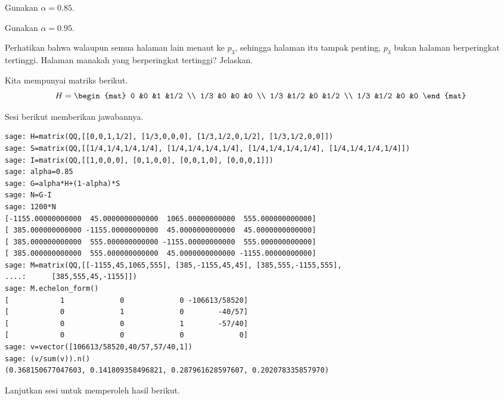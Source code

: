 \begin{exercises}
    \begin{exparts}
      \item Gunakan $\alpha=0.85$.
      \item Gunakan $\alpha=0.95$.
      \item Perhatikan bahwa walaupun semua halaman lain menaut ke $p_3$,
        sehingga halaman itu tampak penting, $p_3$ bukan halaman berperingkat
        tertinggi. Halaman manakah yang berperingkat tertinggi? Jelaskan.
    \end{exparts}
    \begin{answer}
      Kita mempunyai matriks berikut.
      \begin{equation*}
          H=\begin{mat}
               0     &0    &1    &1/2   \\
               1/3   &0    &0    &0   \\
               1/3   &1/2  &0    &1/2 \\
               1/3   &1/2  &0    &0
          \end{mat}
      \end{equation*}
      \begin{exparts}
        \item Sesi \Sage{} berikut memberikan jawabannya.
\begin{lstlisting}
sage: H=matrix(QQ,[[0,0,1,1/2], [1/3,0,0,0], [1/3,1/2,0,1/2], [1/3,1/2,0,0]])
sage: S=matrix(QQ,[[1/4,1/4,1/4,1/4], [1/4,1/4,1/4,1/4], [1/4,1/4,1/4,1/4], [1/4,1/4,1/4,1/4]])
sage: I=matrix(QQ,[[1,0,0,0], [0,1,0,0], [0,0,1,0], [0,0,0,1]])
sage: alpha=0.85
sage: G=alpha*H+(1-alpha)*S
sage: N=G-I
sage: 1200*N
[-1155.00000000000  45.0000000000000  1065.00000000000  555.000000000000]
[ 385.000000000000 -1155.00000000000  45.0000000000000  45.0000000000000]
[ 385.000000000000  555.000000000000 -1155.00000000000  555.000000000000]
[ 385.000000000000  555.000000000000  45.0000000000000 -1155.00000000000]
sage: M=matrix(QQ,[[-1155,45,1065,555], [385,-1155,45,45], [385,555,-1155,555],
....:      [385,555,45,-1155]])
sage: M.echelon_form()
[            1             0             0 -106613/58520]
[            0             1             0        -40/57]
[            0             0             1        -57/40]
[            0             0             0             0]
sage: v=vector([106613/58520,40/57,57/40,1])
sage: (v/sum(v)).n()
(0.368150677047603, 0.141809358496821, 0.287961628597607, 0.202078335857970)
\end{lstlisting}
        \item Lanjutkan sesi \Sage{} untuk memperoleh hasil berikut.

\end{exparts}
\end{answer}
\end{exercises}
